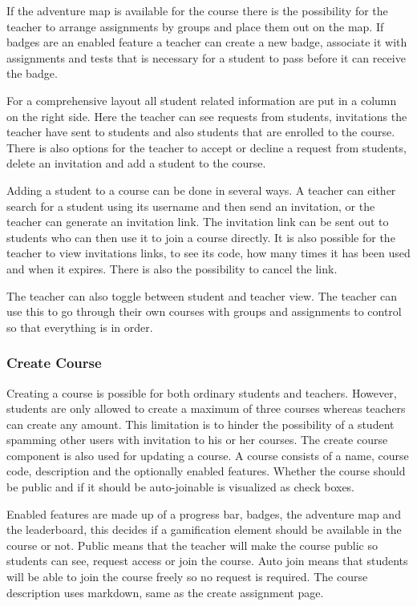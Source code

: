 If the adventure map is available for the course there is the possibility for the teacher to arrange assignments by groups and place them out on the map. If badges are an enabled feature a teacher can create a new badge, associate it with assignments and tests that is necessary for a student to pass before it can receive the badge.

For a comprehensive layout all student related information are put in a column on the right side. Here the teacher can see requests from students, invitations the teacher have sent to students and also students that are enrolled to the course. There is also options for the teacher to accept or decline a request from students, delete an invitation and add a student to the course. 

Adding a student to a course can be done in several ways. A teacher can either search for a student using its username and then send an invitation, or the teacher can generate an invitation link. The invitation link can be sent out to students who can then use it to join a course directly. It is also possible for the teacher to view invitations links, to see its code, how many times it has been used and when it expires. There is also the possibility to cancel the link.

The teacher can also toggle between student and teacher view. The teacher can use this to go through their own courses with groups and assignments to control so that everything is in order. 

\subsubsection{Create Course}
Creating a course is possible for both ordinary students and teachers. However, students are only allowed to create a maximum of three courses whereas teachers can create any amount. This limitation is to hinder the possibility of a student spamming other users with invitation to his or her courses. The create course component is also used for updating a course. A course consists of a name, course code, description and the optionally enabled features. Whether the course should be public and if it should be auto-joinable is visualized as check boxes.

Enabled features are made up of a progress bar, badges, the adventure map and the leaderboard, this decides if a gamification element should be available in the course or not. Public means that the teacher will make the course public so students can see, request access or join the course. Auto join means that students will be able to join the course freely so no request is required. The course description uses markdown, same as the create assignment page. 


